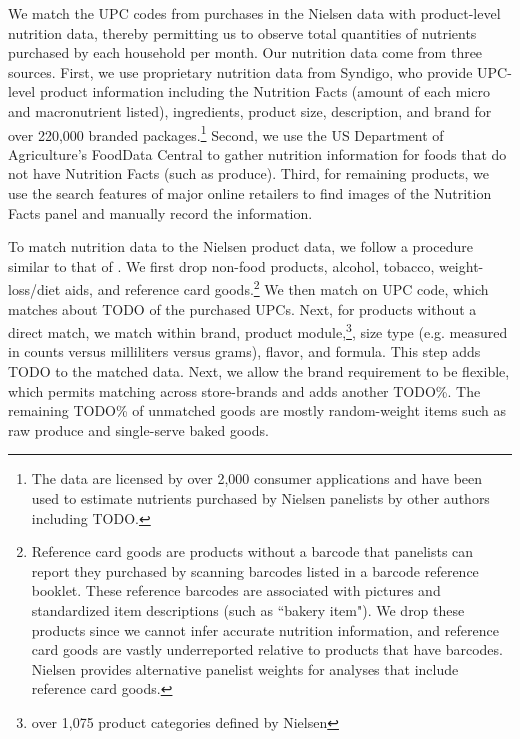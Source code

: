 \documentclass[12pt]{article}
\begin{document}
We match the UPC codes from purchases in the Nielsen data with product-level nutrition data, thereby permitting us to observe total quantities of nutrients purchased by each household per month. Our nutrition data come from three sources. First, we use proprietary nutrition data from Syndigo, who provide UPC-level product information including the Nutrition Facts (amount of each micro and macronutrient listed), ingredients, product size, description, and brand for over 220,000 branded packages.\footnote{The data are licensed by over 2,000 consumer applications and have been used to estimate nutrients purchased by Nielsen panelists by other authors including TODO.} Second, we use the US Department of Agriculture's FoodData Central to gather nutrition information for foods that do not have Nutrition Facts (such as produce). Third, for remaining products, we use the search features of major online retailers to find images of the Nutrition Facts panel and manually record the information.

To match nutrition data to the Nielsen product data, we follow a procedure similar to that of \textcite{dubois2014prices}. We first drop non-food products, alcohol, tobacco, weight-loss/diet aids, and reference card goods.\footnote{Reference card goods are products without a barcode that panelists can report they purchased by scanning barcodes listed in a barcode reference booklet. These reference barcodes are associated with pictures and standardized item descriptions (such as ``bakery item"). We drop these products since we cannot infer accurate nutrition information, and reference card goods are vastly underreported relative to products that have barcodes. Nielsen provides alternative panelist weights for analyses that include reference card goods.} %
We then match on UPC code, which matches about TODO of the purchased UPCs. Next, for products without a direct match, we match within brand, product module,\footnote{over 1,075 product categories defined by Nielsen}, size type (e.g. measured in counts versus milliliters versus grams), flavor, and formula. This step adds TODO to the matched data. Next, we allow the brand requirement to be flexible, which permits matching across store-brands and adds another TODO\%. The remaining TODO\% of unmatched goods are mostly random-weight items such as raw produce and single-serve baked goods.

\end{document}
